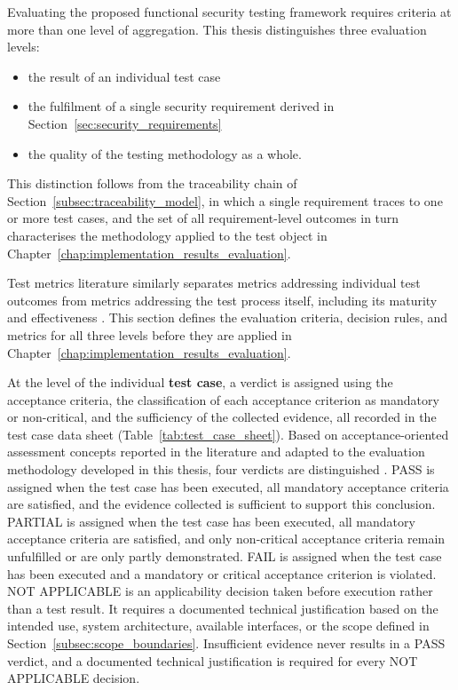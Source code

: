 Evaluating the proposed functional security testing framework requires criteria at more than one level of aggregation. This thesis distinguishes three evaluation levels: 
\begin{itemize}
	\item the result of an individual test case
	\item the fulfilment of a single security requirement derived in Section~\ref{sec:security_requirements}
	\item the quality of the testing methodology as a whole.
\end{itemize}
This distinction follows from the traceability chain of Section~\ref{subsec:traceability_model}, in which a single requirement traces to one or more test cases, and the set of all requirement-level outcomes in turn characterises the methodology applied to the test object in Chapter~\ref{chap:implementation_results_evaluation}. 

Test metrics literature similarly separates metrics addressing individual test outcomes from metrics addressing the test process itself, including its maturity and effectiveness \cite[pp. 144, p. 217]{Witte2019}. This section defines the evaluation criteria, decision rules, and metrics for all three levels before they are applied in Chapter~\ref{chap:implementation_results_evaluation}.

At the level of the individual \textbf{test case}, a verdict is assigned using the acceptance criteria, the classification of each acceptance criterion as mandatory or non-critical, and the sufficiency of the collected evidence, all recorded in the test case data sheet (Table~\ref{tab:test_case_sheet}). Based on acceptance-oriented assessment concepts reported in the literature and adapted to the evaluation methodology developed in this thesis, four verdicts are distinguished \cite[p. 1553]{11050621} \cite[p. 23]{richier2011security}. PASS is assigned when the test case has been executed, all mandatory acceptance criteria are satisfied, and the evidence collected is sufficient to support this conclusion. PARTIAL is assigned when the test case has been executed, all mandatory acceptance criteria are satisfied, and only non-critical acceptance criteria remain unfulfilled or are only partly demonstrated. FAIL is assigned when the test case has been executed and a mandatory or critical acceptance criterion is violated. NOT APPLICABLE is an applicability decision taken before execution rather than a test result. It requires a documented technical justification based on the intended use, system architecture, available interfaces, or the scope defined in Section~\ref{subsec:scope_boundaries}. Insufficient evidence never results in a PASS verdict, and a documented technical justification is required for every NOT APPLICABLE decision.


